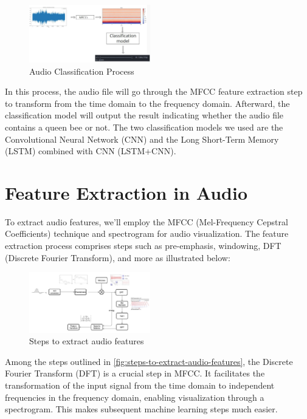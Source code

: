 \documentclass[twocolumn]{article}
\begin{document}
\vspace{-1em}
\begin{figure}[H]
  \centering
  \includegraphics[width=0.47\textwidth]{Audio-Classification-Process.png}
  \caption{Audio Classification Process}
  \label{fig:audio-classification-process}
\end{figure}
\vspace{-1em}

In this process, the audio file will go through the MFCC feature extraction step to
transform from the time domain to the frequency domain. Afterward, the classification
model will output the result indicating whether the audio file contains a queen bee or not.
The two classification models we used are the Convolutional Neural Network (CNN) and the
Long Short-Term Memory (LSTM) combined with CNN (LSTM+CNN).

\section{Feature Extraction in Audio}
To extract audio features, we'll employ the MFCC (Mel-Frequency Cepstral Coefficients)
technique and spectrogram for audio visualization. The feature extraction process comprises
steps such as pre-emphasis, windowing, DFT (Discrete Fourier Transform), and more
\cite{hossan2011novel} as illustrated below:

\vspace{-1em}
\begin{figure}[H]
  \centering
  \includegraphics[width=0.47\textwidth]{Steps-to-extract-audio-features.png}
  \caption{Steps to extract audio features}
  \label{fig:steps-to-extract-audio-features}
\end{figure}
\vspace{-1em}

Among the steps outlined in \autoref{fig:steps-to-extract-audio-features}, the Discrete Fourier Transform (DFT) is a crucial
step in MFCC. It facilitates the transformation of the input signal from the time domain to
independent frequencies in the frequency domain, enabling visualization through a
spectrogram. This makes subsequent machine learning steps much easier.
\end{document}
